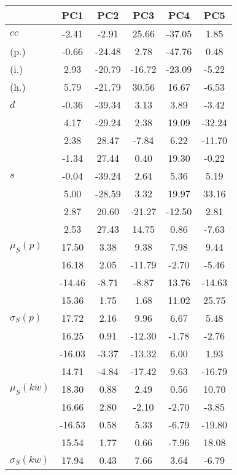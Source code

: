 \begin{table}[h!]
\begin{center}
\begin{tabular}{| l | c | c | c | c | c |}\hline
 & PC1 & PC2 & PC3 & PC4 & PC5 \\\hline
$cc$ & -2.41  & -2.91  & 25.66  & -37.05  & 1.85 \\\hline
(p.) & -0.66  & -24.48  & 2.78  & -47.76  & 0.48 \\\hline
(i.) & 2.93  & -20.79  & -16.72  & -23.09  & -5.22 \\\hline
(h.) & 5.79  & -21.79  & 30.56  & 16.67  & -6.53 \\\hline
$d$ & -0.36  & -39.34  & 3.13  & 3.89  & -3.42 \\\hline
 & 4.17  & -29.24  & 2.38  & 19.09  & -32.24 \\\hline
 & 2.38  & 28.47  & -7.84  & 6.22  & -11.70 \\\hline
 & -1.34  & 27.44  & 0.40  & 19.30  & -0.22 \\\hline
$s$ & -0.04  & -39.24  & 2.64  & 5.36  & 5.19 \\\hline
 & 5.00  & -28.59  & 3.32  & 19.97  & 33.16 \\\hline
 & 2.87  & 20.60  & -21.27  & -12.50  & 2.81 \\\hline
 & 2.53  & 27.43  & 14.75  & 0.86  & -7.63 \\\hline
$\mu_S(p)$ & 17.50  & 3.38  & 9.38  & 7.98  & 9.44 \\\hline
 & 16.18  & 2.05  & -11.79  & -2.70  & -5.46 \\\hline
 & -14.46  & -8.71  & -8.87  & 13.76  & -14.63 \\\hline
 & 15.36  & 1.75  & 1.68  & 11.02  & 25.75 \\\hline
$\sigma_S(p)$ & 17.72  & 2.16  & 9.96  & 6.67  & 5.48 \\\hline
 & 16.25  & 0.91  & -12.30  & -1.78  & -2.76 \\\hline
 & -16.03  & -3.37  & -13.32  & 6.00  & 1.93 \\\hline
 & 14.71  & -4.84  & -17.42  & 9.63  & -16.79 \\\hline
$\mu_S(kw)$ & 18.30  & 0.88  & 2.49  & 0.56  & 10.70 \\\hline
 & 16.66  & 2.80  & -2.10  & -2.70  & -3.85 \\\hline
 & -16.53  & 0.58  & 5.33  & -6.79  & -19.80 \\\hline
 & 15.54  & 1.77  & 0.66  & -7.96  & 18.08 \\\hline
$\sigma_S(kw)$ & 17.94  & 0.43  & 7.66  & 3.64  & -6.79 \\\hline

\end{tabular}
\end{center}
\end{table}
